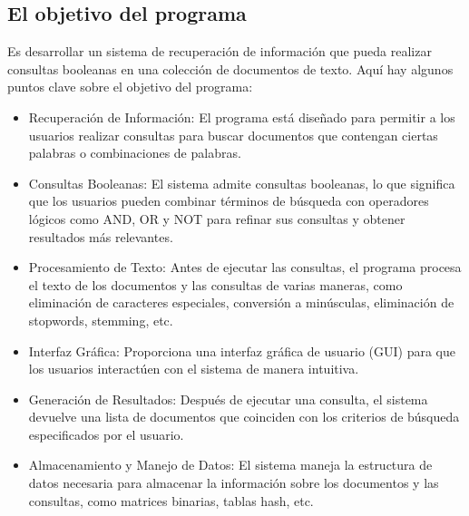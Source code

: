 \subsection{El objetivo del programa}
Es desarrollar un sistema de recuperación de información que pueda realizar consultas booleanas en una colección de documentos de texto. Aquí hay algunos puntos clave sobre el objetivo del programa:
\begin{itemize}
  \item Recuperación de Información: El programa está diseñado para permitir a los usuarios realizar consultas para buscar documentos que contengan ciertas palabras o combinaciones de palabras.
  \item Consultas Booleanas: El sistema admite consultas booleanas, lo que significa que los usuarios pueden combinar términos de búsqueda con operadores lógicos como AND, OR y NOT para refinar sus consultas y obtener resultados más relevantes.
  \item Procesamiento de Texto: Antes de ejecutar las consultas, el programa procesa el texto de los documentos y las consultas de varias maneras, como eliminación de caracteres especiales, conversión a minúsculas, eliminación de stopwords, stemming, etc.
  \item Interfaz Gráfica: Proporciona una interfaz gráfica de usuario (GUI) para que los usuarios interactúen con el sistema de manera intuitiva.
  \item Generación de Resultados: Después de ejecutar una consulta, el sistema devuelve una lista de documentos que coinciden con los criterios de búsqueda especificados por el usuario.
  \item Almacenamiento y Manejo de Datos: El sistema maneja la estructura de datos necesaria para almacenar la información sobre los documentos y las consultas, como matrices binarias, tablas hash, etc.
\end{itemize}